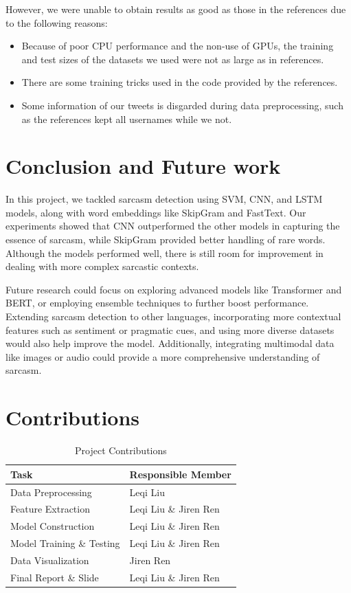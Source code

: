 \documentclass[11pt]{article}
\begin{document}
However, we were unable to obtain results as good as those in the references due to the following reasons:
\begin{itemize}
    \item Because of poor CPU performance and the non-use of GPUs, the training and test sizes of the datasets we used were not as large as in references.
    \item There are some training tricks used in the code provided by the references.
    \item Some information of our tweets is disgarded during data preprocessing, such as the references kept all usernames while we not.
\end{itemize}

\section{Conclusion and Future work}
In this project, we tackled sarcasm detection using SVM, CNN, and LSTM models, along with word embeddings like SkipGram and FastText. Our experiments showed that CNN outperformed the other models in capturing the essence of sarcasm, while SkipGram provided better handling of rare words. Although the models performed well, there is still room for improvement in dealing with more complex sarcastic contexts.

Future research could focus on exploring advanced models like Transformer and BERT, or employing ensemble techniques to further boost performance. Extending sarcasm detection to other languages, incorporating more contextual features such as sentiment or pragmatic cues, and using more diverse datasets would also help improve the model. Additionally, integrating multimodal data like images or audio could provide a more comprehensive understanding of sarcasm.

\section{Contributions}

\begin{table}[ht]
\centering
\begin{tabular}{|l|l|}
\hline
\textbf{Task}              & \textbf{Responsible Member} \\ \hline
Data Preprocessing         & Leqi Liu                    \\ \hline
Feature Extraction         & Leqi Liu \& Jiren Ren       \\ \hline
Model Construction         & Leqi Liu \& Jiren Ren       \\ \hline
Model Training \& Testing  & Leqi Liu \& Jiren Ren       \\ \hline
Data Visualization         & Jiren Ren                   \\ \hline
Final Report \& Slide      & Leqi Liu \& Jiren Ren       \\ \hline
\end{tabular}
\caption{Project Contributions}
\end{table}
\end{document}
